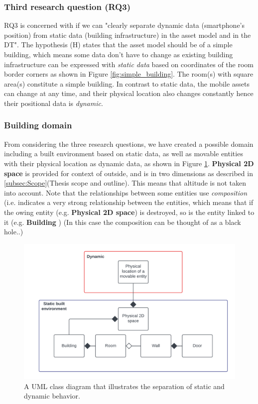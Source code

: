 \documentclass{article}
\begin{document}
\subsubsection{Third research question (RQ3)}
RQ3 is concerned with if we can "clearly separate dynamic data (smartphone's position) from static data (building infrastructure) in the asset model and in the DT". The hypothesis (H) states that the asset model should be of a simple building, which means some data don't have to change as existing building infrastructure can be expressed with \emph{static data} based on coordinates of the room border corners as shown in Figure \ref{fig:simple_building}. The room(s) with square area(s) constitute a simple building. In contrast to static data, the mobile assets can change at any time, and their physical location also changes constantly hence their positional data is \emph{dynamic}.

\subsubsection{Building domain}
From considering the three research questions, we have created a possible domain including a built environment based on static data, as well as movable entities with their physical location as dynamic data, as shown in Figure \ref{fig:static_built_environment}. \textbf{Physical 2D space} is provided for context of outside, and is in two dimensions as described in \ref{subsec:Scope}(Thesis scope and outline). This means that altitude is not taken into account. Note that the relationships between some entities use \emph{composition} (i.e. indicates a very strong relationship between the entities, which means that if the owing entity (e.g. \textbf{Physical 2D space}) is destroyed, so is the entity linked to it (e.g. \textbf{Building} \cite{pilone_uml_2005}) (In this case the composition can be thought of as a black hole..)

\begin{figure}[H]
    \centering
    \includegraphics[scale=0.16]{graphics/static_built_environment.png}
    \caption{A UML class diagram that illustrates the separation of static and dynamic behavior.}
    \label{fig:static_built_environment}
\end{figure}
\end{document}
